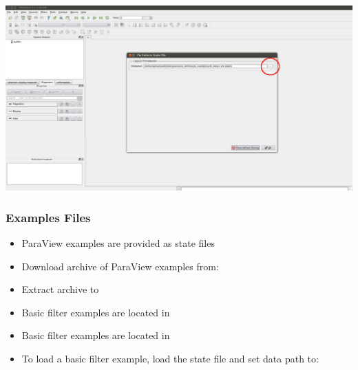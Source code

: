 \begin{frame}[plain]
  \vspace{3cm}
  \includegraphics[width=\textwidth]{screenshots/load-state-file.png}
\end{frame}

\begin{frame}
  \frametitle{Examples Files}

    \begin{itemize}
      \item ParaView examples are provided as state files 
      \item Download archive of ParaView examples from:
      \item Extract archive to 
      \item Basic filter examples are located in 
      \item Basic filter examples are located in 
      \item To load a basic filter example, load the state file and set data path to:
    \end{itemize}
        

\end{frame}

